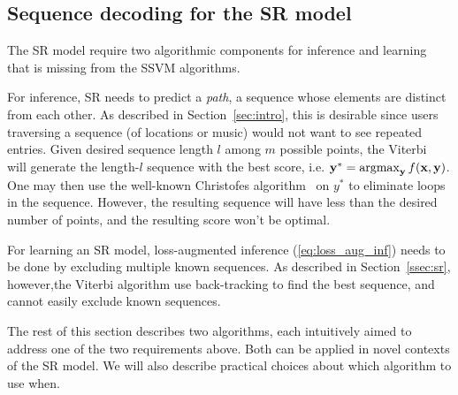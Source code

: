 
\subsection{Sequence decoding for the SR model}
\label{ssec:subtour}

The SR model require two algorithmic components for inference and learning that is missing from the SSVM algorithms.

For inference, SR needs to predict a {\em path}, \ie a sequence whose elements are distinct from each other.
As described in Section~\ref{sec:intro}, this is desirable since users traversing a sequence (of locations or music)
would not want to see repeated entries.
Given desired sequence length $l$ among $m$ possible points, the Viterbi~\cite{tsochantaridis2005large}
will generate the length-$l$ sequence with the best score, i.e. $\mathbf{y}^* = \operatorname*{argmax}_{\mathbf{y}} f(\mathbf{x},\mathbf{y})$.
One may then use the well-known
Christofes algorithm~\cite{christofides1976} on $y^*$ to eliminate loops in the sequence.
However, the resulting sequence will have less than the desired number of points, and the resulting score won't be optimal.

For learning an SR model, loss-augmented inference (\ref{eq:loss_aug_inf}) needs to be done by excluding multiple known sequences.
As described in Section~\ref{ssec:sr}, %
however,the Viterbi algorithm use back-tracking to find the best sequence,
and cannot easily exclude known sequences.


The rest of this section describes two algorithms, each intuitively aimed to address one of the two requirements above.
Both can be applied in novel contexts of the SR model.
We will also describe practical choices about which algorithm to use when.


